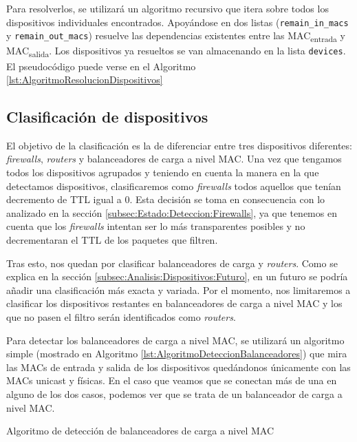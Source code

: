 \documentclass[tfg,epsbased,lof,lot,loa,covers,final,copyright,overleaf]{tfgtfmthesisuam}
\begin{document}
Para resolverlos, se utilizará un algoritmo recursivo que itera sobre todos los dispositivos individuales encontrados. Apoyándose en dos listas (\texttt{remain\_in\_macs} y \texttt{remain\_out\_macs}) resuelve las dependencias existentes entre las MAC\textsubscript{entrada} y MAC\textsubscript{salida}. Los dispositivos ya resueltos se van almacenando en la lista \texttt{devices}. El pseudocódigo puede verse en el Algoritmo \ref{lst:AlgoritmoResolucionDispositivos}

\subsection{Clasificación de dispositivos}
El objetivo de la clasificación es la de diferenciar entre tres dispositivos diferentes: \textit{firewalls}, \textit{routers} y balanceadores de carga a nivel MAC. Una vez que tengamos todos los dispositivos agrupados y teniendo en cuenta la manera en la que detectamos dispositivos, clasificaremos como \textit{firewalls} todos aquellos que tenían decremento de TTL igual a 0. Esta decisión se toma en consecuencia con lo analizado en la sección \ref{subsec:Estado:Deteccion:Firewalls}, ya que tenemos en cuenta que los \textit{firewalls} intentan ser lo más transparentes posibles y no decrementaran el TTL de los paquetes que filtren.

Tras esto, nos quedan por clasificar balanceadores de carga y \textit{routers}. Como se explica en la sección \ref{subsec:Analisis:Dispositivos:Futuro}, en un futuro se podría añadir una clasificación más exacta y variada. Por el momento, nos limitaremos a clasificar los dispositivos restantes en balanceadores de carga a nivel MAC y los que no pasen el filtro serán identificados como \textit{routers}.

Para detectar los balanceadores de carga a nivel MAC, se utilizará un algoritmo simple (mostrado en Algoritmo \ref{lst:AlgoritmoDeteccionBalanceadores}) que mira las MACs de entrada y salida de los dispositivos quedándonos únicamente con las MACs \gls{unicast} y físicas. En el caso que veamos que se conectan más de una en alguno de los dos casos, podemos ver que se trata de un balanceador de carga a nivel MAC.

\begin{algorithm}{}{Algoritmo de detección de balanceadores de carga a nivel MAC}
\end{algorithm}
\end{document}
